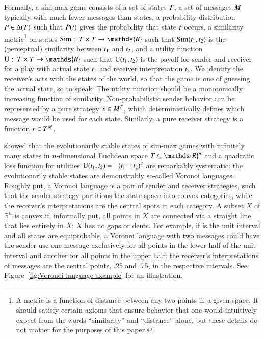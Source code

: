 \documentclass[fleqn,reqno,10pt]{article}
\newcommand{\similarity}{\ensuremath{\mathrm{Sim}}} %
\renewcommand{\Pr}{\ensuremath{P}}
\begin{document}
Formally, a sim-max game consists of a set of states $T$, a set of messages $M$ typically with much
fewer messages than states, a probability distribution $\Pr \in \Delta(\States)$ such that
$\Pr(\state)$ gives the probability that state $t$ occurs, a similarity metric\footnote{A
  metric is a function of distance between any two points in a given space. It should satisfy
  certain axioms that ensure behavior that one would intuitively expect from the words
  ``similarity'' and ``distance'' alone, but these details do not matter for the purposes of
  this paper.}
on states $\similarity \mycolon \States \times \States \rightarrow \mathds{R}$ such that
$\similarity(\mystate{1}, \mystate{2})$ is the (perceptual) similarity between $t_{\mathrm{1}}$
and $t_{\mathrm{2}}$, and a utility function
$\Utils \mycolon \States \times \States \rightarrow \mathds{R}$ such that
$\mathrm{U}(t_{\mathrm{1}}, t_{\mathrm{2}})$ is the payoff for sender and receiver for a play with actual
state $t_{\mathrm{1}}$ and receiver interpretation $t_{\mathrm{2}}$. We identify the receiver's acts
with the states of the world, so that the game is one of guessing the actual state, so to
speak. The utility function should be a monotonically increasing function of similarity.
Non-probabilistic sender behavior can be represented by a pure strategy
$s \in M^T$, which deterministically defines which message would be used for
each state. Similarly, a pure receiver strategy is a function $r \in T^M$.


\citet{JagerMetzger2011:Voronoi-Languag} showed that the evolutionarily stable states of sim-max games with infinitely many states in $n$-dimensional Euclidean space $\States \subseteq \mathds{R}^n$ and a quadratic loss function for utilities $\mathrm{U}(t_{\mathrm{1}}, t_{\mathrm{2}}) = - (t_{\mathrm{1}} - t_{\mathrm{2}})^2$ are remarkably systematic: the evolutionarily stable states are demonstrably so-called Voronoi languages.
Roughly put, a Voronoi
language is a pair of sender and receiver strategies, such that the sender strategy partitions
the state space into convex categories, while the receiver's interpretations are the central
spots in each category. A subset $X$ of $\mathds{R}^n$ is convex if, informally put, all points
in $X$ are connected via a straight line that lies entirely in $X$; $X$ has no gaps or
dents. For example, if \States is the unit interval and all states are equiprobable, a Voronoi
language with two messages could have the sender use one message exclusively for all points in
the lower half of the unit interval and another for all points in the upper half; the
receiver's interpretations of messages are the central points, .25 and .75, in the respective
intervals.  See Figure~\ref{fig:Voronoi-language-example} for an illustration.
\end{document}
